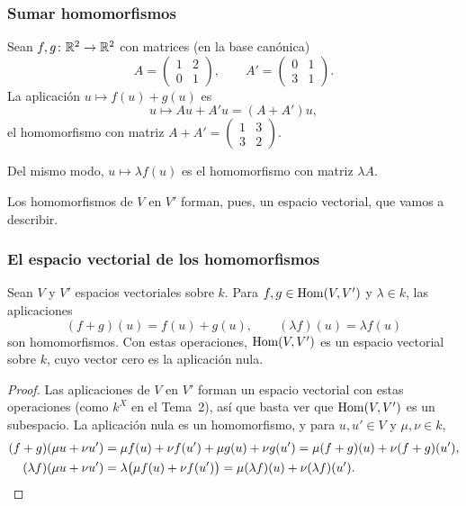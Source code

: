 
\begin{frame}
    \frametitle{Sumar homomorfismos}

    \begin{example}
        Sean $f,g\colon\mathbb{R}^2\to\mathbb{R}^2$ con matrices (en la base canónica)
        \[
            A=\begin{pmatrix}1&2\\0&1\end{pmatrix},\qquad
            A'=\begin{pmatrix}0&1\\3&1\end{pmatrix}.
        \]
        La aplicación $u\mapsto f(u)+g(u)$ es
        \[
            u\longmapsto Au+A'u=(A+A')u,
        \]
        el homomorfismo con matriz
        $A+A'=\begin{pmatrix}1&3\\3&2\end{pmatrix}$.
    \end{example}

    \medskip

    Del mismo modo, $u\mapsto\lambda f(u)$ es el homomorfismo con matriz
    $\lambda A$.

    \medskip

    Los homomorfismos de $V$ en $V'$ forman, pues, un espacio vectorial,
    que vamos a describir.
\end{frame}


\begin{frame}
    \frametitle{El espacio vectorial de los homomorfismos}

    \begin{proposition}
        Sean $V$ y $V'$ espacios vectoriales sobre $k$. Para
        $f,g\in\operatorname{Hom}(V,V')$ y $\lambda\in k$, las aplicaciones
        \[
            (f+g)(u)=f(u)+g(u),\qquad(\lambda f)(u)=\lambda f(u)
        \]
        son homomorfismos. Con estas operaciones, $\operatorname{Hom}(V,V')$ es un
        espacio vectorial sobre $k$, cuyo vector cero es la aplicación
        nula.
    \end{proposition}

    \begin{proof}
        Las aplicaciones de $V$ en $V'$ forman un espacio vectorial con
        estas operaciones (como $k^X$ en el Tema~2), así que basta ver
        que $\operatorname{Hom}(V,V')$ es un subespacio. La aplicación nula es un
        homomorfismo, y para $u,u'\in V$ y $\mu,\nu\in k$,
        \begin{align*}
            (f+g)(\mu u+\nu u')&=\mu f(u)+\nu f(u')+\mu g(u)+\nu g(u')
            =\mu(f+g)(u)+\nu(f+g)(u'),\\
            (\lambda f)(\mu u+\nu u')&=\lambda\bigl(\mu f(u)+\nu f(u')\bigr)
            =\mu(\lambda f)(u)+\nu(\lambda f)(u').\qedhere
        \end{align*}
    \end{proof}
\end{frame}


